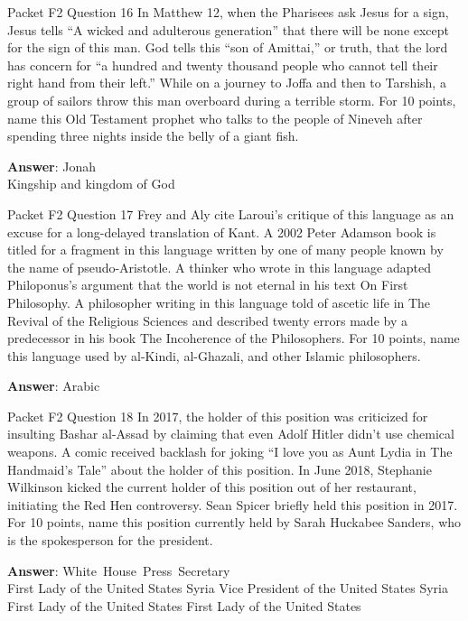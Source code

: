 \begin{frame}{Packet F2 Question 16}
In Matthew 12, when the   Pharisees ask Jesus for a sign, Jesus tells “A wicked and adulterous generation”   that there will be none except for the sign of this man. God tells this “son of Amittai,” or truth,     that the lord has concern for “a hundred and twenty thousand people who cannot tell their right hand from their left.” While on a journey to Joffa and then to Tarshish, a group   of sailors throw this man overboard during a terrible storm. For 10 points, name this Old Testament prophet who talks to the people of Nineveh after spending three nights inside the belly of a giant fish.

\textbf{Answer}: Jonah\\
 Kingship and kingdom of God
\end{frame}

\begin{frame}{Packet F2 Question 17}
Frey and Aly cite Laroui's critique of this language as an excuse for a long-delayed translation of Kant. A 2002 Peter Adamson book is titled for a fragment in this language written   by one of many people known by the name of pseudo-Aristotle.   A thinker who wrote   in this language adapted Philoponus’s argument that the world is not eternal in his text On First Philosophy. A philosopher writing in this language told of ascetic life in The Revival of the Religious Sciences and described twenty errors made by a predecessor in his book The Incoherence of the Philosophers.   For 10 points, name this language used by al-Kindi, al-Ghazali, and other Islamic philosophers.

\textbf{Answer}: Arabic\\
\end{frame}

\begin{frame}{Packet F2 Question 18}
In 2017, the holder of this position was criticized   for insulting Bashar al-Assad   by claiming that even Adolf Hitler didn’t use chemical weapons. A comic received backlash for joking “I love you as Aunt Lydia in The Handmaid’s Tale” about the holder of this position. In June 2018, Stephanie Wilkinson kicked the current holder of this position out of her restaurant, initiating the Red Hen controversy. Sean Spicer briefly held this position in 2017. For 10 points, name this position currently held by Sarah Huckabee Sanders, who is the spokesperson for the president.        

\textbf{Answer}: White\ House\ Press\ Secretary\\
 First Lady of the United States
 Syria
 Vice President of the United States
 Syria
 First Lady of the United States
 First Lady of the United States
\end{frame}


